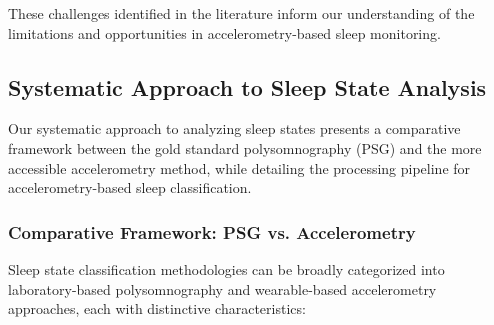 \documentclass[conference]{IEEEtran}
\begin{document}
These challenges identified in the literature inform our understanding of the limitations and opportunities in accelerometry-based sleep monitoring.

\subsection{Systematic Approach to Sleep State Analysis}

Our systematic approach to analyzing sleep states presents a comparative framework between the gold standard polysomnography (PSG) and the more accessible accelerometry method, while detailing the processing pipeline for accelerometry-based sleep classification.

\subsubsection{Comparative Framework: PSG vs. Accelerometry}

Sleep state classification methodologies can be broadly categorized into laboratory-based polysomnography and wearable-based accelerometry approaches, each with distinctive characteristics:
\end{document}
